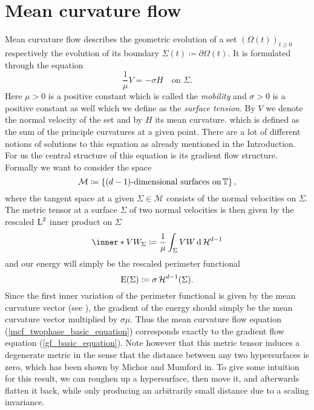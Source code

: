 \section{Mean curvature flow}
	\label{section_mcf}

Mean curvature flow describes the geometric evolution of a set $ ( \Omega ( t ) 
)_{ t \geq 0 } $ respectively the evolution of its boundary $ \Sigma ( t ) 
\coloneqq \partial \Omega ( t ) $. It is formulated through the equation
\begin{equation}
	\label{mcf_twophase_basic_equation}
	\frac{ 1 }{ \mu } V = - \sigma H 
	\quad
	\text{on }
	\Sigma.
\end{equation}
Here $ \mu > 0 $ is a positive constant which is called the \emph{mobility} and 
$ \sigma > 0 $ is a positive constant as well which we define as the 
\emph{surface tension}. By $ V $ we denote the normal velocity of the set and 
by $ H $ its mean curvature. which is defined as the sum of the principle 
curvatures at a given point.
There are a lot of different notions of solutions to this equation as already 
mentioned in the Introduction.
For us the central structure of this equation is its gradient flow structure. Formally we want to consider the space
\begin{equation*}
	\mathcal{ M }
	\coloneqq
	\left\{
		(d-1) \text{-dimensional surfaces on} \operatorname{\mathbb{T}}
	\right\},
\end{equation*}
where the tangent space at a given $ \Sigma \in \mathcal{ M } $ consists of the normal velocities on $ \Sigma $.
The metric tensor at a surface $ \Sigma $ of two normal velocities is then 
given by the rescaled $ \operatorname{L}^{ 2 } $ inner product on $ \Sigma $
\begin{equation*}
	\inner*{ V }{ W }_{ \Sigma }
	\coloneqq
	\frac{ 1 }{ \mu }
	\int_{ \Sigma }
		V W
	\dd{ \hm^{ d - 1 } }
\end{equation*}
and our energy will simply be the rescaled perimeter functional
\begin{equation*}
	\operatorname{E} ( \Sigma )
	\coloneqq
	\sigma \operatorname{\mathcal{H}}^{ d -1 } ( \Sigma ).
\end{equation*}
Since the first inner variation of the perimeter functional is given by the mean curvature vector (see \cite[Thm.~17.5]{maggi_sets_of_finite_perimeter}), the gradient of the energy should simply be the mean curvature vector multiplied by $ \sigma \mu $.
Thus the mean curvature flow equation (\ref{mcf_twophase_basic_equation}) 
corresponds exactly to the gradient flow equation (\ref{gf_basic_equation}).
Note however that this metric tensor induces a degenerate metric in the sense 
that the distance between any two hypersurfaces is zero, which has been shown 
by Michor and Mumford 
in\cite{michor_mumford_riemannian_geometries_on_spaces_of_plane_curves}. 
To give some intuition for this result, we can roughen up a hypersurface, then 
move it, and 
afterwards flatten 
it back, while only producing an arbitrarily small distance due to a scaling 
invariance.


